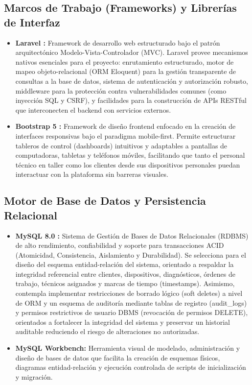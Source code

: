 \subsection{Marcos de Trabajo (Frameworks) y Librerías de Interfaz}

\begin{itemize}
    \item \textbf{Laravel \cite{otwell2024}:} Framework de desarrollo web estructurado bajo el patrón arquitectónico Modelo-Vista-Controlador (MVC). Laravel provee mecanismos nativos esenciales para el proyecto: enrutamiento estructurado, motor de mapeo objeto-relacional (ORM Eloquent) para la gestión transparente de consultas a la base de datos, sistema de autenticación y autorización robusto, middleware para la protección contra vulnerabilidades comunes (como inyección SQL y CSRF), y facilidades para la construcción de APIs RESTful que interconecten el backend con servicios externos.
    \item \textbf{Bootstrap 5 \cite{otto2023}:} Framework de diseño frontend enfocado en la creación de interfaces responsivas bajo el paradigma mobile-first. Permite estructurar tableros de control (dashboards) intuitivos y adaptables a pantallas de computadoras, tabletas y teléfonos móviles, facilitando que tanto el personal técnico en taller como los clientes desde sus dispositivos personales puedan interactuar con la plataforma sin barreras visuales.
\end{itemize}

\subsection{Motor de Base de Datos y Persistencia Relacional}

\begin{itemize}
    \item \textbf{MySQL 8.0 \cite{oracle2024}:} Sistema de Gestión de Bases de Datos Relacionales (RDBMS) de alto rendimiento, confiabilidad y soporte para transacciones ACID (Atomicidad, Consistencia, Aislamiento y Durabilidad). Se selecciona para el diseño del esquema entidad-relación del sistema, orientado a respaldar la integridad referencial entre clientes, dispositivos, diagnósticos, órdenes de trabajo, técnicos asignados y marcas de tiempo (timestamps). Asimismo, contempla implementar restricciones de borrado lógico (soft deletes) a nivel de ORM y un esquema de auditoría mediante tablas de registro (audit\_logs) y permisos restrictivos de usuario DBMS (revocación de permisos DELETE), orientados a fortalecer la integridad del sistema y preservar un historial auditable reduciendo el riesgo de alteraciones no autorizadas.
    \item \textbf{MySQL Workbench:} Herramienta visual de modelado, administración y diseño de bases de datos que facilita la creación de esquemas físicos, diagramas entidad-relación y ejecución controlada de scripts de inicialización y migración.
\end{itemize}

